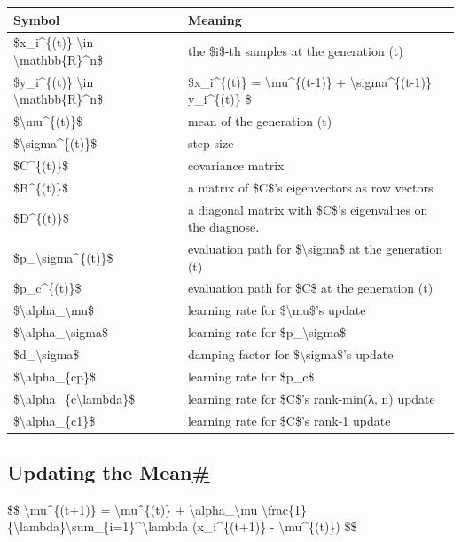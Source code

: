 \begin{longtable}[]{@{}ll@{}}
\toprule\noalign{}
Symbol & Meaning \\
\midrule\noalign{}
\endhead
\bottomrule\noalign{}
\endlastfoot
\$x\_i\^{}\{(t)\} \textbackslash in \textbackslash mathbb\{R\}\^{}n\$ & the \$i\$-th samples at the generation (t) \\
\$y\_i\^{}\{(t)\} \textbackslash in \textbackslash mathbb\{R\}\^{}n\$ & \$x\_i\^{}\{(t)\} = \textbackslash mu\^{}\{(t-1)\} + \textbackslash sigma\^{}\{(t-1)\} y\_i\^{}\{(t)\} \$ \\
\$\textbackslash mu\^{}\{(t)\}\$ & mean of the generation (t) \\
\$\textbackslash sigma\^{}\{(t)\}\$ & step size \\
\$C\^{}\{(t)\}\$ & covariance matrix \\
\$B\^{}\{(t)\}\$ & a matrix of \$C\$'s eigenvectors as row vectors \\
\$D\^{}\{(t)\}\$ & a diagonal matrix with \$C\$'s eigenvalues on the diagnose. \\
\$p\_\textbackslash sigma\^{}\{(t)\}\$ & evaluation path for \$\textbackslash sigma\$ at the generation (t) \\
\$p\_c\^{}\{(t)\}\$ & evaluation path for \$C\$ at the generation (t) \\
\$\textbackslash alpha\_\textbackslash mu\$ & learning rate for \$\textbackslash mu\$'s update \\
\$\textbackslash alpha\_\textbackslash sigma\$ & learning rate for \$p\_\textbackslash sigma\$ \\
\$d\_\textbackslash sigma\$ & damping factor for \$\textbackslash sigma\$'s update \\
\$\textbackslash alpha\_\{cp\}\$ & learning rate for \$p\_c\$ \\
\$\textbackslash alpha\_\{c\textbackslash lambda\}\$ & learning rate for \$C\$'s rank-min(λ, n) update \\
\$\textbackslash alpha\_\{c1\}\$ & learning rate for \$C\$'s rank-1 update \\
\end{longtable}

\subsection{\texorpdfstring{Updating the Mean\hyperref[updating-the-mean]{\#}}{Updating the Mean\#}}\label{updating-the-mean}

\$\$ \textbackslash mu\^{}\{(t+1)\} = \textbackslash mu\^{}\{(t)\} + \textbackslash alpha\_\textbackslash mu \textbackslash frac\{1\}\{\textbackslash lambda\}\textbackslash sum\_\{i=1\}\^{}\textbackslash lambda (x\_i\^{}\{(t+1)\} - \textbackslash mu\^{}\{(t)\}) \$\$

